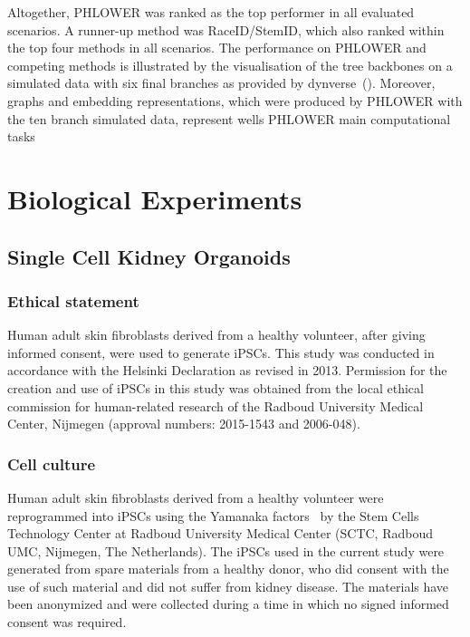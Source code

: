Altogether, PHLOWER was ranked as the top performer in all evaluated scenarios. A runner-up method was RaceID/StemID, which also ranked within the top four methods in all scenarios. The performance on PHLOWER and competing methods is illustrated by the visualisation of the tree backbones on a simulated data with six final branches as provided by dynverse~(). Moreover, graphs and embedding representations, which were produced by PHLOWER with the ten branch simulated data, represent wells PHLOWER main computational tasks


\section{Biological Experiments}
\label{PHLOWER_bench:bio_exp}
\subsection{Single Cell Kidney Organoids}

\subsubsection{Ethical statement}

Human adult skin fibroblasts derived from a healthy volunteer, after giving informed consent, were used to generate iPSCs. This study was conducted in accordance with the Helsinki Declaration as revised in 2013. Permission for the creation and use of iPSCs in this study was obtained from the local ethical commission for human-related research of the Radboud University Medical Center, Nijmegen (approval numbers: 2015-1543 and 2006-048).

\subsubsection{Cell culture}

Human adult skin fibroblasts derived from a healthy volunteer were reprogrammed into iPSCs using the Yamanaka factors~\citep{takahashi2006induction} by the Stem Cells Technology Center at Radboud University Medical Center (SCTC, Radboud UMC, Nijmegen, The Netherlands). The iPSCs used in the current study were generated from spare materials from a healthy donor, who did consent with the use of such material and did not suffer from kidney disease. The materials have been anonymized and were collected during a time in which no signed informed consent was required.

